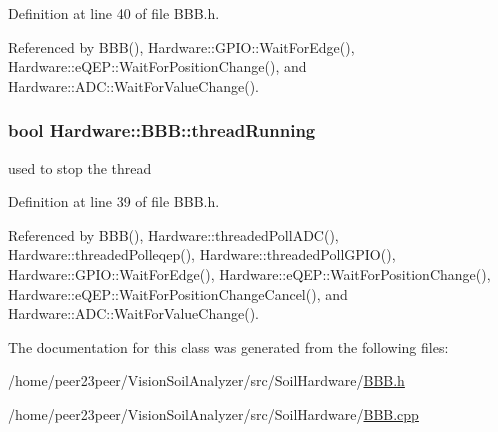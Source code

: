 Definition at line 40 of file B\+B\+B.\+h.



Referenced by B\+B\+B(), Hardware\+::\+G\+P\+I\+O\+::\+Wait\+For\+Edge(), Hardware\+::e\+Q\+E\+P\+::\+Wait\+For\+Position\+Change(), and Hardware\+::\+A\+D\+C\+::\+Wait\+For\+Value\+Change().

\hypertarget{class_hardware_1_1_b_b_b_a0d9d8c56afb37955e0d0c6baf0f418df}{}
\subsubsection[{thread\+Running}]{\setlength{\rightskip}{0pt plus 5cm}bool Hardware\+::\+B\+B\+B\+::thread\+Running\hspace{0.3cm}{\ttfamily [protected]}}\label{class_hardware_1_1_b_b_b_a0d9d8c56afb37955e0d0c6baf0f418df}
used to stop the thread 

Definition at line 39 of file B\+B\+B.\+h.



Referenced by B\+B\+B(), Hardware\+::threaded\+Poll\+A\+D\+C(), Hardware\+::threaded\+Polleqep(), Hardware\+::threaded\+Poll\+G\+P\+I\+O(), Hardware\+::\+G\+P\+I\+O\+::\+Wait\+For\+Edge(), Hardware\+::e\+Q\+E\+P\+::\+Wait\+For\+Position\+Change(), Hardware\+::e\+Q\+E\+P\+::\+Wait\+For\+Position\+Change\+Cancel(), and Hardware\+::\+A\+D\+C\+::\+Wait\+For\+Value\+Change().



The documentation for this class was generated from the following files\+:\begin{DoxyCompactItemize}
\item 
/home/peer23peer/\+Vision\+Soil\+Analyzer/src/\+Soil\+Hardware/\hyperlink{_b_b_b_8h}{B\+B\+B.\+h}\item 
/home/peer23peer/\+Vision\+Soil\+Analyzer/src/\+Soil\+Hardware/\hyperlink{_b_b_b_8cpp}{B\+B\+B.\+cpp}\end{DoxyCompactItemize}
